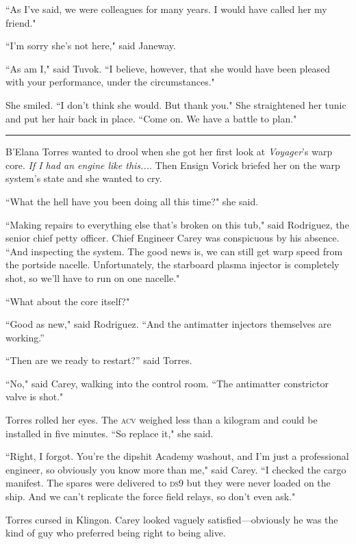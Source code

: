 \documentclass[twoside,letterpaper,12pt]{memoir}
\begin{document}
``As I've said, we were colleagues for many years. I would have called her my friend."

``I'm sorry she's not here," said Janeway.

``As am I," said Tuvok. ``I believe, however, that she would have been pleased with your performance, under the circumstances."

She smiled. ``I don't think she would. But thank you." She straightened her tunic and put her hair back in place. ``Come on. We have a battle to plan."

\begin{center}\rule{3cm}{0.4 pt}\end{center}

B'Elana Torres wanted to drool when she got her first look at \textit{Voyager}'s warp core. \textit{If I had an engine like this...}. Then Ensign Vorick briefed her on the warp system's state and she wanted to cry.

``What the hell have you been doing all this time?" she said.

``Making repairs to everything else that's broken on this tub," said Rodriguez, the senior chief petty officer. Chief Engineer Carey was conspicuous by his absence. ``And inspecting the system. The good news is, we can still get warp speed from the portside nacelle. Unfortunately, the starboard plasma injector is completely shot, so we'll have to run on one nacelle."

``What about the core itself?"

``Good as new," said Rodriguez. ``And the antimatter injectors themselves are working.”

``Then are we ready to restart?” said Torres.

``No," said Carey, walking into the control room. ``The antimatter constrictor valve is shot."

Torres rolled her eyes. The \textsc{acv} weighed less than a kilogram and could be installed in five minutes. ``So replace it," she said.

``Right, I forgot. You're the dipshit Academy washout, and I'm just a professional engineer, so obviously you know more than me," said Carey. ``I checked the cargo manifest. The spares were delivered to \textsc{ds9} but they were never loaded on the ship. And we can't replicate the force field relays, so don't even ask."

Torres cursed in Klingon. Carey looked vaguely satisfied---obviously he was the kind of guy who preferred being right to being alive.
\end{document}
